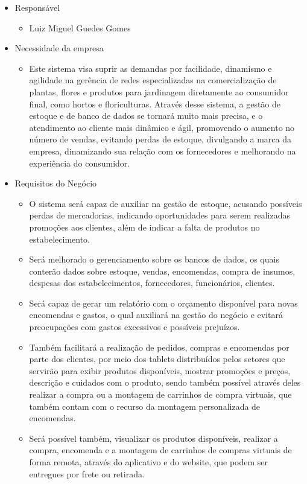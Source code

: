 \begin{itemize}
\item Responsável
	\begin{itemize}
	\item Luiz Miguel Guedes Gomes 
	\end{itemize}
\item Necessidade da empresa
	\begin{itemize}
	\item Este sistema visa suprir as demandas por facilidade, dinamismo e agilidade na gerência de redes especializadas na
comercialização de plantas, flores e produtos para jardinagem diretamente ao consumidor final, como hortos e floriculturas.
Através desse sistema, a gestão de estoque e de banco de dados se tornará muito mais precisa, e o atendimento ao cliente mais dinâmico e ágil, promovendo o aumento no número de vendas, evitando perdas de estoque, divulgando a marca da empresa, dinamizando sua relação com os fornecedores e melhorando na experiência do consumidor.
	\end{itemize}
\item Requisitos do Negócio
	\begin{itemize}
	\item O sistema será capaz de auxiliar na gestão de estoque, acusando possíveis perdas de mercadorias, indicando
oportunidades para serem realizadas promoções aos clientes, além de indicar a falta de produtos no estabelecimento.
	\item Será melhorado o gerenciamento sobre os bancos de dados, os quais conterão dados sobre estoque, vendas, encomendas, compra de insumos, despesas dos estabelecimentos, fornecedores, funcionários, clientes.
	\item Será capaz de gerar um relatório com o orçamento disponível para novas encomendas e gastos, o qual auxiliará na gestão do negócio e evitará preocupações com gastos excessivos e possíveis prejuízos.
	\item Também facilitará a realização de pedidos, compras e encomendas por parte dos clientes, por meio dos tablets distribuídos pelos setores que servirão para exibir produtos disponíveis, mostrar promoções e preços, descrição e cuidados com o produto, sendo também possível através deles realizar a compra ou a montagem de carrinhos de compra virtuais, que também contam com o recurso da montagem personalizada de encomendas.
	\item Será possível também, visualizar os produtos disponíveis, realizar a compra, encomenda e a montagem de carrinhos de compras virtuais de forma remota, através do aplicativo e do website, que podem ser entregues por frete ou retirada.

\end{itemize}
\end{itemize}
